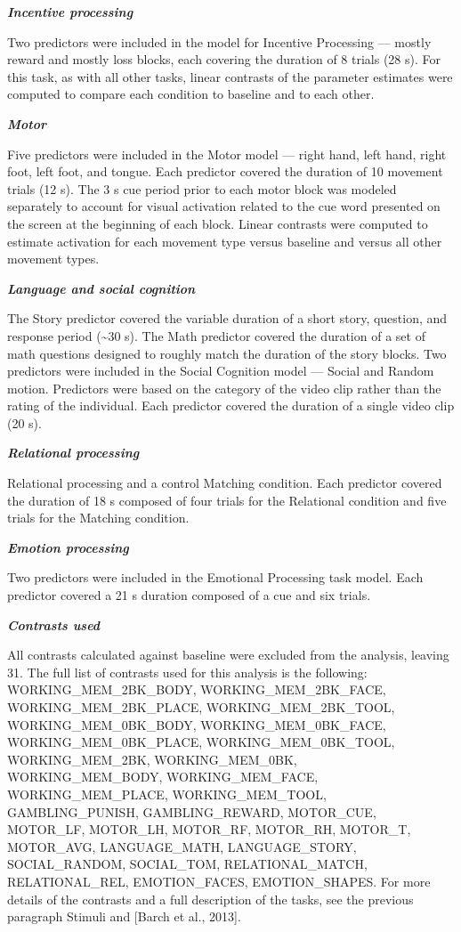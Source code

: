 \documentclass[11pt]{article}
\begin{document}
\textbf{\emph{Incentive processing}}

Two predictors were included in the model for Incentive Processing ---
mostly reward and mostly loss blocks, each covering the duration of 8
trials (28 s). For this task, as with all other tasks, linear contrasts
of the parameter estimates were computed to compare each condition to
baseline and to each other.

\textbf{\emph{Motor}}

Five predictors were included in the Motor model --- right hand, left
hand, right foot, left foot, and tongue. Each predictor covered the
duration of 10 movement trials (12 s). The 3 s cue period prior to each
motor block was modeled separately to account for visual activation
related to the cue word presented on the screen at the beginning of each
block. Linear contrasts were computed to estimate activation for each
movement type versus baseline and versus all other movement types.

\textbf{\emph{Language and social cognition}}

The Story predictor covered the variable duration of a short story,
question, and response period (\textasciitilde30 s). The Math predictor
covered the duration of a set of math questions designed to roughly
match the duration of the story blocks. Two predictors were included in
the Social Cognition model --- Social and Random motion. Predictors were
based on the category of the video clip rather than the rating of the
individual. Each predictor covered the duration of a single video clip
(20 s).

\textbf{\emph{Relational processing}}

Relational processing and a control Matching condition. Each predictor
covered the duration of 18 s composed of four trials for the Relational
condition and five trials for the Matching condition.

\textbf{\emph{Emotion processing}}

Two predictors were included in the Emotional Processing task model.
Each predictor covered a 21 s duration composed of a cue and six trials.

\textbf{\emph{Contrasts used}}

All contrasts calculated against baseline were excluded from the
analysis, leaving 31. The full list of contrasts used for this analysis
is the following: WORKING\_MEM\_2BK\_BODY, WORKING\_MEM\_2BK\_FACE,
WORKING\_MEM\_2BK\_PLACE, WORKING\_MEM\_2BK\_TOOL,
WORKING\_MEM\_0BK\_BODY, WORKING\_MEM\_0BK\_FACE,
WORKING\_MEM\_0BK\_PLACE, WORKING\_MEM\_0BK\_TOOL, WORKING\_MEM\_2BK,
WORKING\_MEM\_0BK, WORKING\_MEM\_BODY, WORKING\_MEM\_FACE,
WORKING\_MEM\_PLACE, WORKING\_MEM\_TOOL, GAMBLING\_PUNISH,
GAMBLING\_REWARD, MOTOR\_CUE, MOTOR\_LF, MOTOR\_LH, MOTOR\_RF,
MOTOR\_RH, MOTOR\_T, MOTOR\_AVG, LANGUAGE\_MATH, LANGUAGE\_STORY,
SOCIAL\_RANDOM, SOCIAL\_TOM, RELATIONAL\_MATCH, RELATIONAL\_REL,
EMOTION\_FACES, EMOTION\_SHAPES. For more details of the contrasts and a
full description of the tasks, see the previous paragraph Stimuli and
{[}Barch et al., 2013{]}.
\end{document}
